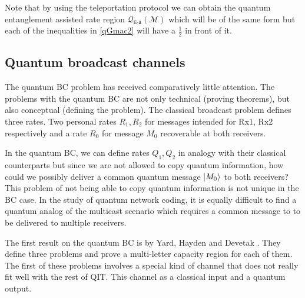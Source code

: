 \documentclass[aps,11pt,twoside,letterpaper]{article}
\newcommand{\mcal}{\mathcal}
\begin{document}
		
		Note that by using the teleportation protocol we can obtain the quantum 
		entanglement assisted rate region $\mcal{Q}_{\texttt{E-A}}(\mcal{M})$ 
		which will be of the same form but each of the inequalities in \eqref{qGmac2}
		will have a $\frac{1}{2}$ in front of it.
		
		
		
		

		

	\subsection{Quantum broadcast channels}


		The quantum BC problem has received comparatively little attention.
		The problems with the quantum BC are not only technical (proving theorems), 
		but also conceptual (defining the problem).
		The classical broadcast problem defines three rates. 
		Two personal rates  $R_1,R_2$ for messages intended for Rx1, Rx2 respectively
		and a rate $R_0$ for message $M_0$ recoverable at both receivers.

		In the quantum BC, we can define rates $Q_1,Q_2$ in analogy with their
		classical counterparts but since we are not allowed to copy quantum information,
		how could we possibly deliver a common quantum message $| M_0 \rangle$ to both receivers?
		This problem of not being able to copy quantum information is not
		unique in the BC case. 
		In the study of quantum network coding, it is equally difficult to find a 
		quantum analog of the multicast scenario which requires a common message
		to to be delivered to multiple receivers.
		
		
		The first result on the quantum BC is by Yard, Hayden and Devetak \cite{YHD2006}.
		They define three problems and prove a multi-letter capacity region for each of them.
		The first of these problems involves a special kind of channel that does not 
		really fit well with the rest of QIT. This channel as a classical input and a quantum output.
		
\end{document}
